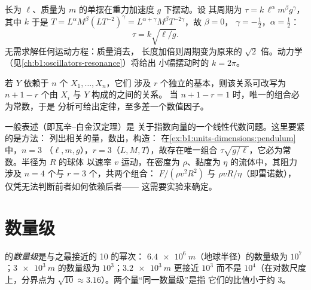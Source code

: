 \begin{example}[单摆的周期]\label{ex:b1:units-dimensions:pendulum}
长为 $\ell$、质量为 $m$ 的单摆在重力加速度 $g$ 下摆动。设
其周期为 $\tau = k\,\ell^\alpha m^\beta g^\gamma$，其中 $k$
于是 $T = L^\alpha M^\beta (L T^{-2})^\gamma =
L^{\alpha+\gamma} M^\beta T^{-2\gamma}$，故 $\beta = 0$，
$\gamma = -\tfrac12$，$\alpha = \tfrac12$：
\[
\tau = k\sqrt{\ell/g} .
\]
无需求解任何运动方程：质量消去，
长度加倍则周期变为原来的 $\sqrt2$ 倍。动力学
（见\cref{ch:b1:oscillators-resonance}）将给出
小幅摆动时的 $k = 2\pi$。
\end{example}

\begin{proposition}[无量纲组合]\label{prop:b1:units-dimensions:pi}
若 $Y$ 依赖于 $n$ 个 $X_1, \dots, X_n$，它们
涉及 $r$ 个独立的基本，则该关系可改写为
$n + 1 - r$ 个由 $X_i$ 与 $Y$ 构成的之间的关系。
当 $n + 1 - r = 1$ 时，唯一的组合必为常数，于是
分析可给出定律，至多差一个数值因子。
\end{proposition}
\admitted

\begin{remark}[命题的应用]\label{rem:b1:units-dimensions:pi}
一般表述（即瓦辛–白金汉定理）是
关于指数向量的一个线性代数问题。这里要紧的是方法：
列出相关的量，数出，构造：
在\cref{ex:b1:units-dimensions:pendulum}中，$n = 3$
（$\ell, m, g$），$r = 3$（$L, M, T$），故存在唯一组合
$\tau\sqrt{g/\ell}$，它必为常数。半径为 $R$ 的球体
以速率 $v$ 运动，在密度为 $\rho$、黏度为 $\eta$ 的流体中，其阻力
涉及 $n = 4$ 个与 $r = 3$ 个，共两个组合：
$F/(\rho v^2 R^2)$ 与 $\rho v R/\eta$（即雷诺数），
仅凭无法判断前者如何依赖后者——
这需要实验来确定。
\end{remark}

\section{数量级}

\begin{definition}[数量级]\label{def:b1:units-dimensions:oom}
的\emph{数量级}是与之最接近的 10 的幂次：
$\qty{6.4e6}{m}$（地球半径）的数量级为
$10^7$；$\qty{3e3}{m}$ 的数量级为 $10^3$；$\qty{3.2e3}{m}$ 更接近
$10^3$ 而不是 $10^4$（在对数尺度上，分界点为
$\sqrt{10} \approx 3.16$）。两个量“同一数量级”是指
它们的比值小于约 $3$。
\end{definition}

